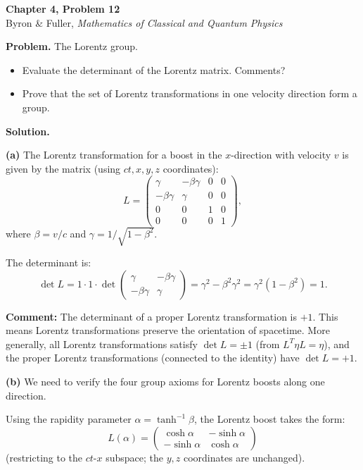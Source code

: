 \documentclass[12pt]{article}
\begin{document}
\begin{center}
{\Large\bfseries Chapter 4, Problem 12}\\[6pt]
Byron \& Fuller, \textit{Mathematics of Classical and Quantum Physics}
\end{center}

\bigskip

\textbf{Problem.} The Lorentz group.
\begin{itemize}
\item[(a)] Evaluate the determinant of the Lorentz matrix. Comments?
\item[(b)] Prove that the set of Lorentz transformations in one velocity direction form a group.
\end{itemize}

\bigskip
\textbf{Solution.}

\textbf{(a)} The Lorentz transformation for a boost in the $x$-direction with velocity $v$ is given by the matrix (using $ct, x, y, z$ coordinates):
\[
L = \begin{pmatrix} \gamma & -\beta\gamma & 0 & 0 \\ -\beta\gamma & \gamma & 0 & 0 \\ 0 & 0 & 1 & 0 \\ 0 & 0 & 0 & 1 \end{pmatrix},
\]
where $\beta = v/c$ and $\gamma = 1/\sqrt{1 - \beta^2}$.

The determinant is:
\[
\det L = 1 \cdot 1 \cdot \det\begin{pmatrix} \gamma & -\beta\gamma \\ -\beta\gamma & \gamma \end{pmatrix} = \gamma^2 - \beta^2\gamma^2 = \gamma^2(1 - \beta^2) = 1.
\]

\textbf{Comment:} The determinant of a proper Lorentz transformation is $+1$. This means Lorentz transformations preserve the orientation of spacetime. More generally, all Lorentz transformations satisfy $\det L = \pm 1$ (from $L^T \eta L = \eta$), and the proper Lorentz transformations (connected to the identity) have $\det L = +1$.

\bigskip
\textbf{(b)} We need to verify the four group axioms for Lorentz boosts along one direction.

Using the rapidity parameter $\alpha = \tanh^{-1}\beta$, the Lorentz boost takes the form:
\[
L(\alpha) = \begin{pmatrix} \cosh\alpha & -\sinh\alpha \\ -\sinh\alpha & \cosh\alpha \end{pmatrix}
\]
(restricting to the $ct$-$x$ subspace; the $y,z$ coordinates are unchanged).
\end{document}
